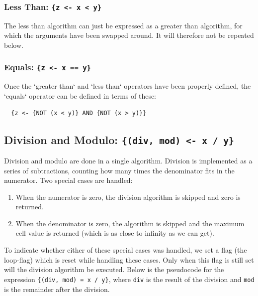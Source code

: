 \subsubsection{Less Than: \texttt{\{z <- x < y\}}}
The less than algorithm can just be expressed as a greater than algorithm, for which the arguments have been swapped around. It will therefore not be repeated below.

\subsubsection{Equals: \texttt{\{z <- x == y\}}}
Once the `greater than` and `less than` operators have been properly defined, the `equals` operator can be defined in terms of these:
\begin{lstlisting}
  {z <- {NOT (x < y)} AND {NOT (x > y)}}
\end{lstlisting}

\subsection{Division and Modulo: \texttt{\{(div, mod) <- x / y\}}}
Division and modulo are done in a single algorithm. Division is implemented as a series of subtractions, counting how many times the denominator fits in the numerator. Two special cases are handled:
\begin{enumerate}
\item When the numerator is zero, the division algorithm is skipped and zero is returned.
\item When the denominator is zero, the algorithm is skipped and the maximum cell value is returned (which is as close to infinity as we can get).
\end{enumerate}
To indicate whether either of these special cases was handled, we set a flag (the loop-flag) which is reset while handling these cases. Only when this flag is still set will the division algorithm be executed. Below is the pseudocode for the expression \texttt{\{(div, mod) = x / y\}}, where \texttt{div} is the result of the division and \texttt{mod} is the remainder after the division.

